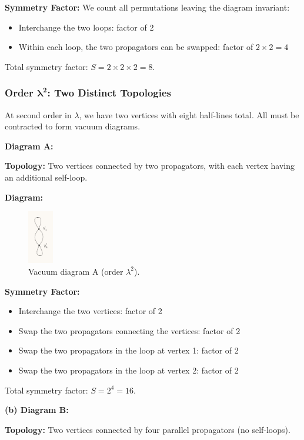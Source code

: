 \documentclass[11pt, a4paper]{article}
\begin{document}
\textbf{Symmetry Factor:} We count all permutations leaving the diagram invariant:
\begin{itemize}
    \item Interchange the two loops: factor of 2
    \item Within each loop, the two propagators can be swapped: factor of $2 \times 2 = 4$
\end{itemize}
Total symmetry factor: $S = 2 \times 2 \times 2 = 8$.

\subsubsection*{Order $\mathbf{\lambda^2}$: Two Distinct Topologies}

At second order in $\lambda$, we have two vertices with eight half-lines total. All must be contracted to form vacuum diagrams.

\textbf{ Diagram A:}

\textbf{Topology:} Two vertices connected by two propagators, with each vertex having an additional self-loop.

\textbf{Diagram:} 
\begin{figure}[H]
    \centering
    \includegraphics[width=0.1\textwidth]{2-1.jpg}
    \caption{Vacuum diagram A (order $\lambda^2$).}
    \label{fig:figureooo}
\end{figure}

\textbf{Symmetry Factor:}
\begin{itemize}
    \item Interchange the two vertices: factor of 2
    \item Swap the two propagators connecting the vertices: factor of 2
    \item Swap the two propagators in the loop at vertex 1: factor of 2
    \item Swap the two propagators in the loop at vertex 2: factor of 2
\end{itemize}
Total symmetry factor: $S = 2^4 = 16$.


\textbf{(b) Diagram B:}

\textbf{Topology:} Two vertices connected by four parallel propagators (no self-loops).
\end{document}
